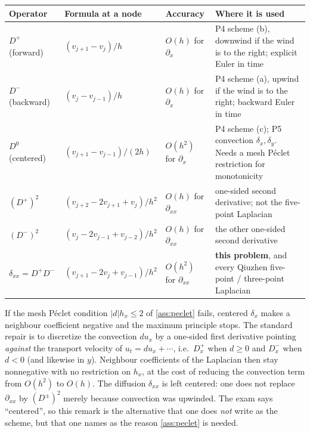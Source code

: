 \documentclass[11pt,a4paper]{article}
\begin{document}
{\footnotesize
\begin{center}
\begin{tabular}{@{}>{\raggedright\arraybackslash}p{2.35cm}
                   >{\raggedright\arraybackslash}p{4.15cm}
                   >{\raggedright\arraybackslash}p{2.35cm}
                   >{\raggedright\arraybackslash}p{4.95cm}@{}}
\toprule
Operator & Formula at a node & Accuracy & Where it is used \\
\midrule
\(D^+\) (forward)
&
\((v_{j+1}-v_j)/h\)
&
\(O(h)\) for \(\partial_x\)
&
P4 scheme (b), downwind if the wind is to the right; explicit Euler in time
\\
\(D^-\) (backward)
&
\((v_j-v_{j-1})/h\)
&
\(O(h)\) for \(\partial_x\)
&
P4 scheme (a), upwind if the wind is to the right; backward Euler in time
\\
\(D^0\) (centered)
&
\((v_{j+1}-v_{j-1})/(2h)\)
&
\(O(h^2)\) for \(\partial_x\)
&
P4 scheme (c); P5 convection \(\delta_x,\delta_y\). Needs a mesh P\'eclet restriction for monotonicity
\\
\((D^+)^2\)
&
\((v_{j+2}-2v_{j+1}+v_j)/h^2\)
&
\(O(h)\) for \(\partial_{xx}\)
&
one-sided second derivative; not the five-point Laplacian
\\
\((D^-)^2\)
&
\((v_j-2v_{j-1}+v_{j-2})/h^2\)
&
\(O(h)\) for \(\partial_{xx}\)
&
the other one-sided second derivative
\\
\(\delta_{xx}=D^+D^-\)
&
\((v_{j+1}-2v_j+v_{j-1})/h^2\)
&
\(O(h^2)\) for \(\partial_{xx}\)
&
\textbf{this problem}, and every Qiuzhen five-point / three-point Laplacian
\\
\bottomrule
\end{tabular}
\end{center}
}

\begin{remark}
\label{rem:upwind-p5}
If the mesh P\'eclet condition \(\lvert d\rvert h_x\le 2\) of \cref{ass:peclet} fails, centered \(\delta_x\) makes a neighbour coefficient negative and the maximum principle stops. The standard repair is to discretize the convection \(d u_x\) by a one-sided first derivative pointing \emph{against} the transport velocity of \(u_t=d u_x+\cdots\), i.e.\ \(D_x^+\) when \(d\ge 0\) and \(D_x^-\) when \(d<0\) (and likewise in \(y\)). Neighbour coefficients of the Laplacian then stay nonnegative with no restriction on \(h_x\), at the cost of reducing the convection term from \(O(h^2)\) to \(O(h)\). The diffusion \(\delta_{xx}\) is left centered: one does not replace \(\partial_{xx}\) by \((D^\pm)^2\) merely because convection was upwinded. The exam says ``centered'', so this remark is the alternative that one does \emph{not} write as the scheme, but that one names as the reason \cref{ass:peclet} is needed.
\end{remark}
\end{document}
